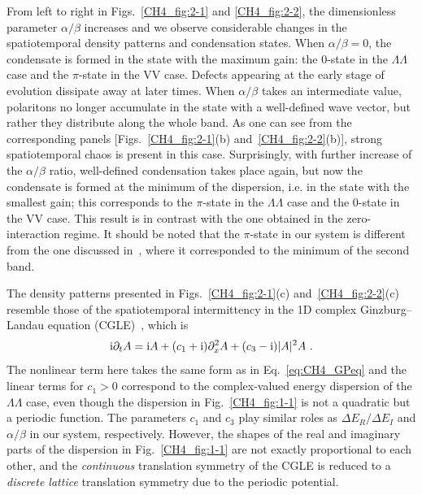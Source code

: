 From left to right in Figs.~\ref{CH4_fig:2-1} and \ref{CH4_fig:2-2}, the dimensionless parameter $\alpha/\beta$ increases and we observe considerable changes in the spatiotemporal density patterns and condensation states.
When $\alpha/\beta=0$, the condensate is formed in the state with the maximum gain: the $0$-state in the $\Lambda \Lambda$ case and the $\pi$-state in the VV case.
Defects appearing at the early stage of evolution dissipate away at later times.
When $\alpha/\beta$ takes an intermediate value, polaritons no longer accumulate in the state with a well-defined wave vector, but rather they distribute along the whole band.
As one can see from the corresponding panels [Figs.~\ref{CH4_fig:2-1}(b) and~\ref{CH4_fig:2-2}(b)], strong spatiotemporal chaos is present in this case.
Surprisingly, with further increase of the $\alpha/\beta$ ratio, well-defined condensation takes place again, but now the condensate is formed at the minimum of the dispersion, i.e. in the state with the smallest gain; this corresponds to the $\pi$-state in the $\Lambda \Lambda$ case and the $0$-state in the VV case.
This result is in contrast with the one obtained in the zero-interaction regime.
It should be noted that the $\pi$-state in our system is different from the one discussed in~\cite{Lai:2007aa}, where it corresponded to the minimum of the second band.

The density patterns presented in Figs.~\ref{CH4_fig:2-1}(c) and~\ref{CH4_fig:2-2}(c) resemble those of the spatiotemporal intermittency in the 1D complex Ginzburg--Landau equation (CGLE)~\cite{Chate:1994aa,Melo:1993aa,Hecke:1998aa},
which is
%
\begin{equation}\label{CH4_eq:NLSE}
\mathrm{i} \partial_t A = \mathrm{i} A + (c_1+ \mathrm{i} )\partial_x^2 A + (c_3 - \mathrm{i})|A|^2 A \ .
\end{equation}
%
The nonlinear term here takes the same form as in Eq.~\eqref{eq:CH4_GPeq} and the linear terms for $c_1>0$ correspond to the complex-valued energy dispersion of the $\Lambda \Lambda$ case, even though the dispersion in Fig.~\ref{CH4_fig:1-1} is not a quadratic but a periodic function.
The parameters $c_1$ and $c_3$ play similar roles as ${\Delta}E_R/{\Delta}E_I$ and $\alpha/\beta$ in our system, respectively.
However, the shapes of the real and imaginary parts of the dispersion in Fig.~\ref{CH4_fig:1-1} are not exactly proportional to each other, and the \textit{continuous} translation symmetry of the CGLE is reduced to a \textit{discrete lattice} translation symmetry due to the periodic potential.

